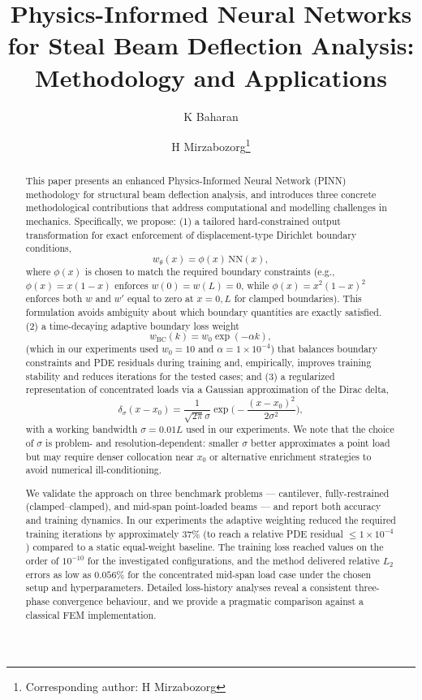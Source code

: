 \documentclass[twocolumn]{svjour3}
\begin{document}
	\justifying%

	\title{Physics-Informed Neural Networks for Steal Beam Deflection Analysis: Methodology and Applications}
	\author{K Baharan \and H Mirzabozorg\thanks{Corresponding author: H Mirzabozorg}}
	\date{}
	
	\maketitle
	\begin{abstract}
		This paper presents an enhanced Physics-Informed Neural Network (PINN) methodology for structural beam deflection analysis, and introduces three concrete methodological contributions that address computational and modelling challenges in mechanics. Specifically, we propose: (1) a tailored hard-constrained output transformation for exact enforcement of displacement-type Dirichlet boundary conditions,
		\[
			w_{\theta}(x)=\phi(x)\,\mathrm{NN}(x),
		\]
		where \(\phi(x)\) is chosen to match the required boundary constraints (e.g., \(\phi(x)=x(1-x)\) enforces \(w(0)=w(L)=0\), while \(\phi(x)=x^2(1-x)^2\) enforces both \(w\) and \(w'\) equal to zero at \(x=0,L\) for clamped boundaries). This formulation avoids ambiguity about which boundary quantities are exactly satisfied. (2) a time-decaying adaptive boundary loss weight
		\[
			w_{\mathrm{BC}}(k)=w_0\exp(-\alpha k),
		\]
		(which in our experiments used \(w_0=10\) and \(\alpha=1\times10^{-4}\)) that balances boundary constraints and PDE residuals during training and, empirically, improves training stability and reduces iterations for the tested cases; and (3) a regularized representation of concentrated loads via a Gaussian approximation of the Dirac delta,
		\[
			\delta_\sigma(x-x_0)=\frac{1}{\sqrt{2\pi}\sigma}\exp\!\Big(-\frac{(x-x_0)^2}{2\sigma^2}\Big),
		\]
		with a working bandwidth \(\sigma=0.01L\) used in our experiments. We note that the choice of \(\sigma\) is problem- and resolution-dependent: smaller \(\sigma\) better approximates a point load but may require denser collocation near \(x_0\) or alternative enrichment strategies to avoid numerical ill-conditioning.
		
		We validate the approach on three benchmark problems — cantilever, fully-restrained (clamped–clamped), and mid-span point-loaded beams — and report both accuracy and training dynamics. In our experiments the adaptive weighting reduced the required training iterations by approximately \(37\%\) (to reach a relative PDE residual \(\le 1\times10^{-4}\)) compared to a static equal-weight baseline. The training loss reached values on the order of \(10^{-10}\) for the investigated configurations, and the method delivered relative \(L_2\) errors as low as \(0.056\%\) for the concentrated mid-span load case under the chosen setup and hyperparameters. Detailed loss-history analyses reveal a consistent three-phase convergence behaviour, and we provide a pragmatic comparison against a classical FEM implementation.
		

\end{abstract}
\end{document}
